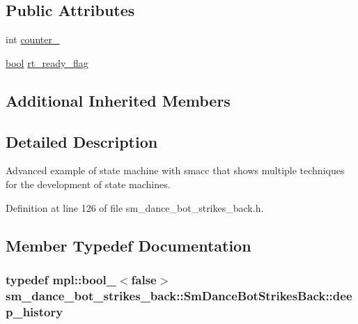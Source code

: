 \subsection*{Public Attributes}
\begin{DoxyCompactItemize}
\item 
int \hyperlink{structsm__dance__bot__strikes__back_1_1SmDanceBotStrikesBack_a0cf56e316022dde4b3da552ab9f68513}{counter\+\_}
\item 
\hyperlink{classbool}{bool} \hyperlink{structsm__dance__bot__strikes__back_1_1SmDanceBotStrikesBack_a609265a94c2575580fbb014f551a066a}{rt\+\_\+ready\+\_\+flag}
\end{DoxyCompactItemize}
\subsection*{Additional Inherited Members}


\subsection{Detailed Description}
Advanced example of state machine with smacc that shows multiple techniques for the development of state machines. 

Definition at line 126 of file sm\+\_\+dance\+\_\+bot\+\_\+strikes\+\_\+back.\+h.



\subsection{Member Typedef Documentation}
\subsubsection[{\texorpdfstring{deep\+\_\+history}{deep_history}}]{\setlength{\rightskip}{0pt plus 5cm}typedef mpl\+::bool\+\_\+$<$false$>$ {\bf sm\+\_\+dance\+\_\+bot\+\_\+strikes\+\_\+back\+::\+Sm\+Dance\+Bot\+Strikes\+Back\+::deep\+\_\+history}}\hypertarget{structsm__dance__bot__strikes__back_1_1SmDanceBotStrikesBack_a3192d4079cbcf0739c7002538767ad22}{}\label{structsm__dance__bot__strikes__back_1_1SmDanceBotStrikesBack_a3192d4079cbcf0739c7002538767ad22}


